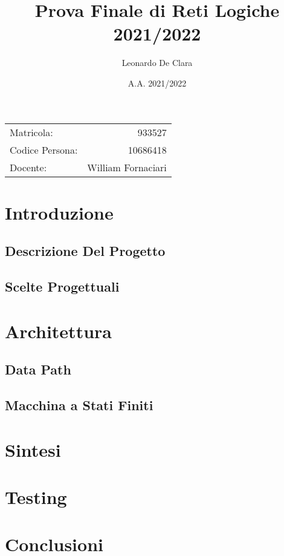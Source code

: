 \documentclass[a4paper]{article}
\begin{document}
\title{Prova Finale di Reti Logiche 2021/2022} %
\author{Leonardo De Clara} %
\date{A.A. 2021/2022}
\maketitle %
\begin{center}
\begin{tabular}{l r}
Matricola: & 933527\\ %
Codice Persona: & 10686418\\
Docente: & William Fornaciari	 %
\end{tabular}
\end{center}

\newpage

\tableofcontents
\newpage

\section{Introduzione}
\subsection{Descrizione Del Progetto}
\subsection{Scelte Progettuali}

\newpage
\section{Architettura}
\subsection{Data Path}
\subsection{Macchina a Stati Finiti}

\newpage
\section{Sintesi}

\newpage
\section{Testing}

\newpage
\section{Conclusioni}


\newpage
\end{document}
